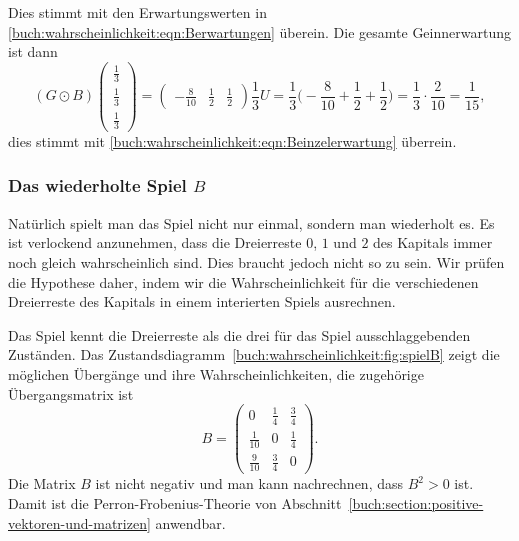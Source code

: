 Dies stimmt mit den Erwartungswerten in 
\eqref{buch:wahrscheinlichkeit:eqn:Berwartungen}
überein.
Die gesamte Geinnerwartung ist dann
\begin{equation}
(G\odot B)
\begin{pmatrix}\frac13\\\frac13\\\frac13\end{pmatrix}
=
\begin{pmatrix}-\frac{8}{10}&\frac12&\frac12\end{pmatrix}
\frac13U
=
\frac13\biggl(-\frac{8}{10}+\frac12+\frac12\biggr)
=
\frac13\cdot\frac{2}{10}
=
\frac{1}{15},
\label{buch:wahrscheinlichkeit:eqn:BodotEinzelerwartung}
\end{equation}
dies stimmt mit \eqref{buch:wahrscheinlichkeit:eqn:Beinzelerwartung}
überrein.

\subsubsection{Das wiederholte Spiel $B$}
Natürlich spielt man das Spiel nicht nur einmal, sondern man wiederholt es.
Es ist verlockend anzunehmen, dass die Dreierreste $0$, $1$ und $2$ des
Kapitals immer noch gleich wahrscheinlich sind.
Dies braucht jedoch nicht so zu sein.
Wir prüfen die Hypothese daher, indem wir die Wahrscheinlichkeit
für die verschiedenen Dreierreste des Kapitals in einem interierten
Spiels ausrechnen.

Das Spiel kennt die Dreierreste als die drei für das Spiel ausschlaggebenden
Zuständen.
Das Zustandsdiagramm~\ref{buch:wahrscheinlichkeit:fig:spielB} zeigt
die möglichen Übergänge und ihre Wahrscheinlichkeiten, die zugehörige
Übergangsmatrix ist
\[
B
=
\begin{pmatrix}
0          &\frac14 &\frac34\\
\frac1{10} &0       &\frac14\\
\frac9{10} &\frac34 &0
\end{pmatrix}.
\]
Die Matrix $B$ ist nicht negativ und man kann nachrechnen, dass $B^2>0$ ist.
Damit ist die Perron-Frobenius-Theorie von
Abschnitt~\ref{buch:section:positive-vektoren-und-matrizen}
anwendbar.

